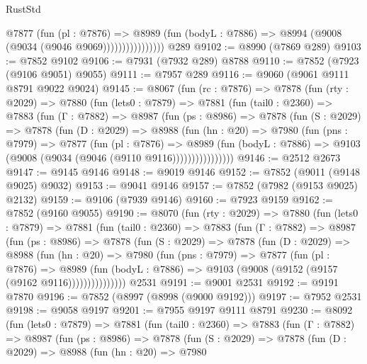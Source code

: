 \begin{lexlean}{RustStd}
\begin{coremodule}
                        @7877
                          (fun (pl : @7876) =>
                          @8989
                            (fun (bodyL : @7886) => @8994 (@9008 (@9034 (@9046 @9069))))))))))))))))
    @289
@9102 := @8990 (@7869 @289)
@9103 := @7852 @9102
@9106 := @7931 (@7932 @289) @8788
@9110 := @7852 (@7923 (@9106 @9051) @9055)
@9111 := @7957 @289
@9116 := @9060 (@9061 @9111 @8791 @9022 @9024)
@9145 := @8067
    (fun (rc : @7876) =>
    @7878
      (fun (rty : @2029) =>
      @7880
        (fun (lets0 : @7879) =>
        @7881
          (fun (tail0 : @2360) =>
          @7883
            (fun (Γ : @7882) =>
            @8987
              (fun (ps : @8986) =>
              @7878
                (fun (S : @2029) =>
                @7878
                  (fun (D : @2029) =>
                  @8988
                    (fun (hn : @20) =>
                    @7980
                      (fun (pns : @7979) =>
                      @7877
                        (fun (pl : @7876) =>
                        @8989
                          (fun (bodyL : @7886) =>
                          @9103 (@9008 (@9034 (@9046 (@9110 @9116))))))))))))))))
@9146 := @2512 @2673
@9147 := @9145 @9146
@9148 := @9019 @9146
@9152 := @7852 (@9011 (@9148 @9025) @9032)
@9153 := @9041 @9146
@9157 := @7852 (@7982 (@9153 @9025) @2132)
@9159 := @9106 (@7939 @9146)
@9160 := @7923 @9159
@9162 := @7852 (@9160 @9055)
@9190 := @8070
    (fun (rty : @2029) =>
    @7880
      (fun (lets0 : @7879) =>
      @7881
        (fun (tail0 : @2360) =>
        @7883
          (fun (Γ : @7882) =>
          @8987
            (fun (ps : @8986) =>
            @7878
              (fun (S : @2029) =>
              @7878
                (fun (D : @2029) =>
                @8988
                  (fun (hn : @20) =>
                  @7980
                    (fun (pns : @7979) =>
                    @7877
                      (fun (pl : @7876) =>
                      @8989
                        (fun (bodyL : @7886) =>
                        @9103 (@9008 (@9152 (@9157 (@9162 @9116)))))))))))))))
    @2531
@9191 := @9001 @2531
@9192 := @9191 @7870
@9196 := @7852 (@8997 (@8998 (@9000 @9192)))
@9197 := @7952 @2531
@9198 := @9058 @9197
@9201 := @7955 @9197 @9111 @8791
@9230 := @8092
    (fun (lets0 : @7879) =>
    @7881
      (fun (tail0 : @2360) =>
      @7883
        (fun (Γ : @7882) =>
        @8987
          (fun (ps : @8986) =>
          @7878
            (fun (S : @2029) =>
            @7878
              (fun (D : @2029) =>
              @8988
                (fun (hn : @20) =>
                @7980

\end{coremodule}
\end{lexlean}
